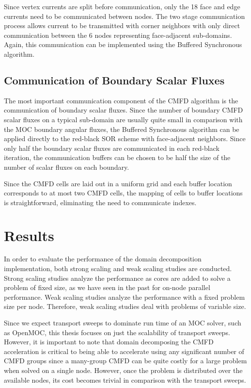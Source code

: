 Since vertex currents are split before communication, only the 18 face and edge currents need to be communicated between nodes. The two stage communication process allows current to be transmitted with corner neighbors with only direct communication between the 6 nodes representing face-adjacent sub-domains. Again, this communication can be implemented using the Buffered Synchronous algorithm.

\subsection{Communication of Boundary Scalar Fluxes}

The most important communication component of the \ac{CMFD} algorithm is the communication of boundary scalar fluxes. Since the number of boundary \ac{CMFD} scalar fluxes on a typical sub-domain are usually quite small in comparison with the \ac{MOC} boundary angular fluxes, the Buffered Synchronous algorithm can be applied directly to the red-black SOR scheme with face-adjacent neighbors. Since only half the boundary scalar fluxes are communicated in each red-black iteration, the communication buffers can be chosen to be half the size of the number of scalar fluxes on each boundary.

Since the \ac{CMFD} cells are laid out in a uniform grid and each buffer location corresponds to at most two \ac{CMFD} cells, the mapping of cells to buffer locations is straightforward, eliminating the need to communicate indexes.

\section{Results}

In order to evaluate the performance of the domain decomposition implementation, both strong scaling and weak scaling studies are conducted. Strong scaling studies analyze the performance as cores are added to solve a problem of fixed size, as we have seen in the past for on-node parallel performance. Weak scaling studies analyze the performance with a fixed problem size per node. Therefore, weak scaling studies deal with problems of variable size.

Since we expect transport sweeps to dominate run time of an \ac{MOC} solver, such as OpenMOC, this thesis focuses on just the scalability of transport sweeps. However, it is important to note that domain decomposing the \ac{CMFD} acceleration is critical to being able to accelerate using any significant number of \ac{CMFD} groups since a many-group \ac{CMFD} can be quite costly for a large problem when solved on a single node. However, once the problem is distributed over the available nodes, its cost becomes trivial in comparison with the transport sweeps.

